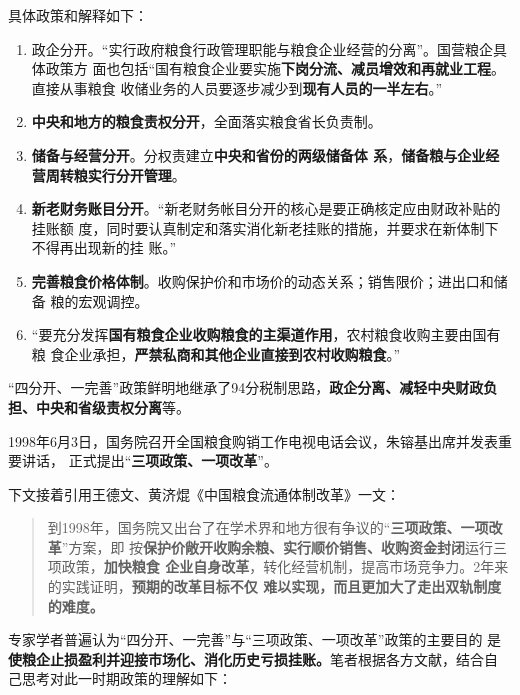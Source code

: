 具体政策和解释如下：
\begin{enumerate}
\item 政企分开。“实行政府粮食行政管理职能与粮食企业经营的分离”。国营粮企具体政策方
  面也包括“国有粮食企业要实施\textbf{下岗分流、减员增效和再就业工程}。直接从事粮食
  收储业务的人员要逐步减少到\textbf{现有人员的一半左右}。”

\item \textbf{中央和地方的粮食责权分开}，全面落实粮食省长负责制。

\item \textbf{储备与经营分开}。分权责建立\textbf{中央和省份的两级储备体
    系}，\textbf{储备粮与企业经营周转粮实行分开管理}。

\item \textbf{新老财务账目分开}。“新老财务帐目分开的核心是要正确核定应由财政补贴的挂账额
  度，同时要认真制定和落实消化新老挂账的措施，并要求在新体制下不得再出现新的挂
  账。”\cite{caobaoming01}

\item \textbf{完善粮食价格体制}。收购保护价和市场价的动态关系；销售限价；进出口和储备
  粮的宏观调控。

\item “要充分发挥\textbf{国有粮食企业收购粮食的主渠道作用}，农村粮食收购主要由国有粮
  食企业承担，\textbf{严禁私商和其他企业直接到农村收购粮食}。”
\end{enumerate}

“四分开、一完善”政策鲜明地继承了94分税制思路，\textbf{政企分离、减轻中央财政负
  担、中央和省级责权分离}等。

1998年6月3日，国务院召开全国粮食购销工作电视电话会议，朱镕基出席并发表重要讲话，
正式提出“\textbf{三项政策、一项改革}”。

下文接着引用王德文、黄济焜《中国粮食流通体制改革》一文：
\begin{quotation}
  到1998年，国务院又出台了在学术界和地方很有争议的“\textbf{三项政策、一项改革}”方案，即
  按\textbf{保护价敞开收购余粮、实行顺价销售、收购资金封闭}运行三项政策，\textbf{加快粮食
    企业自身改革}，转化经营机制，提高市场竞争力。2年来的实践证明，\textbf{预期的改革目标不仅
    难以实现，而且更加大了走出双轨制度的难度。}\cite{shuangguizhi}
\end{quotation}

专家学者普遍认为“四分开、一完善”与“三项政策、一项改革”政策的主要目的
是\textbf{使粮企止损盈利并迎接市场化、消化历史亏损挂账。}笔者根据各方文献，结合自
己思考对此一时期政策的理解如下：

